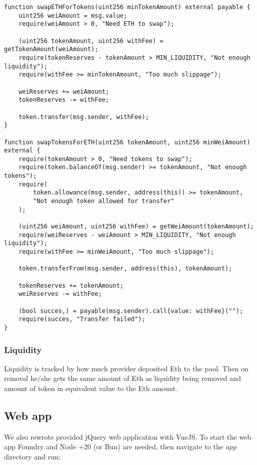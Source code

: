 \documentclass[11pt,a4paper]{article}
\begin{document}
\begin{verbatim}
function swapETHForTokens(uint256 minTokenAmount) external payable {
    uint256 weiAmount = msg.value;
    require(weiAmount > 0, "Need ETH to swap");

    (uint256 tokenAmount, uint256 withFee) = getTokenAmount(weiAmount);
    require(tokenReserves - tokenAmount > MIN_LIQUIDITY, "Not enough liquidity");
    require(withFee >= minTokenAmount, "Too much slippage");

    weiReserves += weiAmount;
    tokenReserves -= withFee;

    token.transfer(msg.sender, withFee);
}

function swapTokensForETH(uint256 tokenAmount, uint256 minWeiAmount) external {
    require(tokenAmount > 0, "Need tokens to swap");
    require(token.balanceOf(msg.sender) >= tokenAmount, "Not enough tokens");
    require(
        token.allowance(msg.sender, address(this)) >= tokenAmount,
        "Not enough token allowed for transfer"
    );

    (uint256 weiAmount, uint256 withFee) = getWeiAmount(tokenAmount);
    require(weiReserves - weiAmount > MIN_LIQUIDITY, "Not enough liquidity");
    require(withFee >= minWeiAmount, "Too much slippage");

    token.transferFrom(msg.sender, address(this), tokenAmount);

    tokenReserves += tokenAmount;
    weiReserves -= withFee;

    (bool succes,) = payable(msg.sender).call{value: withFee}("");
    require(succes, "Transfer failed");
}
\end{verbatim}

\subsubsection*{Liquidity}

Liquidity is tracked by how much provider deposited Eth to the pool. Then
on removal he/she gets the same amount of Eth as liquidity being removed
and amount of token in equivalent value to the Eth amount.

\subsection*{Web app}

We also rewrote provided jQuery web application with VueJS. To start the web app
Foundry and Node +20 (or Bun) are needed, then navigate to the \emph{app} directory
and run:
\end{document}
